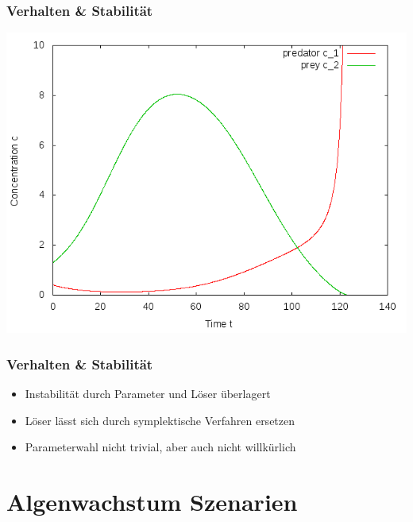 \documentclass[12pt]{beamer}
\begin{document}
    \begin{frame}
    \frametitle{Verhalten \& Stabilität}
    \includegraphics[scale=0.5]{Bilder/n2_explodiert.png}
    \end{frame}
    
    \begin{frame}
    \frametitle{Verhalten \& Stabilität}
    \begin{itemize}
      \item Instabilität durch Parameter und Löser überlagert
      \item Löser lässt sich durch symplektische Verfahren ersetzen
      \item Parameterwahl nicht trivial, aber auch nicht willkürlich
    \end{itemize}
    \end{frame}
    
    \section{Algenwachstum Szenarien}
    
\end{document}
